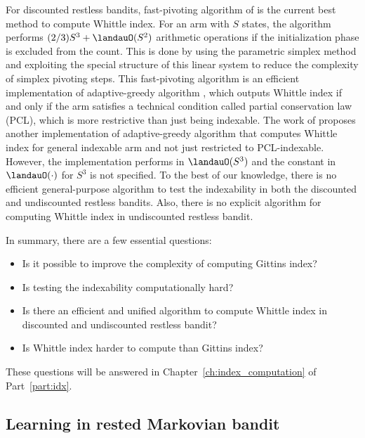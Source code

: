 For discounted restless bandits, fast-pivoting algorithm of \cite{nino2020fast} is the current best method to compute Whittle index.
For an arm with $S$ states, the algorithm performs $(2/3)S^3+\landauO(S^2)$ arithmetic operations if the initialization phase is excluded from the count.
This is done by using the parametric simplex method and exploiting the special structure of this linear system to reduce the complexity of simplex pivoting steps. This fast-pivoting algorithm is an efficient implementation of adaptive-greedy algorithm \cite{nino2007dynamic}, which outputs Whittle index if and only if the arm satisfies a technical condition called partial conservation law (PCL), which is more restrictive than just being indexable.
The work of \cite{akbarzadeh2020conditions} proposes another implementation of adaptive-greedy algorithm that computes Whittle index for general indexable arm and not just restricted to PCL-indexable.
However, the implementation performs in $\landauO(S^3)$ and the constant in $\landauO(\cdot)$ for $S^3$ is not specified.
To the best of our knowledge, there is no efficient general-purpose algorithm to test the indexability in both the discounted and undiscounted restless bandits.
Also, there is no explicit algorithm for computing Whittle index in undiscounted restless bandit.

In summary, there are a few essential questions:
\begin{itemize}
    \item Is it possible to improve the complexity of computing Gittins index?
    \item Is testing the indexability computationally hard?
    \item Is there an efficient and unified algorithm to compute Whittle index in discounted and undiscounted restless bandit?
    \item Is Whittle index harder to compute than Gittins index?
\end{itemize}

These questions will be answered in Chapter~\ref{ch:index_computation} of Part~\ref{part:idx}.

\subsection{Learning in rested Markovian bandit}

